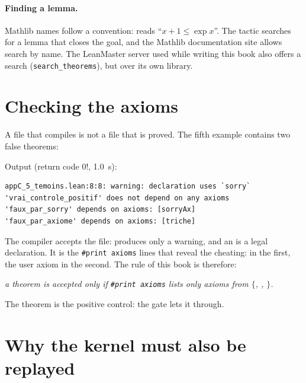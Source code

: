 \paragraph{Finding a lemma.} Mathlib names follow a convention:  reads ``$x+1\le\exp x$''. The
tactic  searches for a lemma that closes the goal, and the Mathlib documentation site allows search by
name. The LeanMaster server used while writing this book also offers a search (\texttt{search\_theorems}), but over its
own library.

\section{Checking the axioms}\label{appC:sec:axiomes}

A file that compiles is not a file that is proved. The fifth example contains two false theorems:

\noindent Output (return code $0$!, 1.0~s):
\begin{lstlisting}[style=appC,language={}]
appC_5_temoins.lean:8:8: warning: declaration uses `sorry`
'vrai_controle_positif' does not depend on any axioms
'faux_par_sorry' depends on axioms: [sorryAx]
'faux_par_axiome' depends on axioms: [triche]
\end{lstlisting}
The compiler accepts the file:  produces only a warning, and an  is a legal declaration. It is
the \texttt{\#print axioms} lines that reveal the cheating:  in the first, the user axiom 
in the second. The rule of this book is therefore:
\begin{center}
\emph{a theorem is accepted only if \texttt{\#print axioms} lists only axioms from
$\{$, , $\}$.}
\end{center}
The theorem  is the positive control: the gate lets it through.

\section{Why the kernel must also be replayed}\label{appC:sec:leanchecker}


